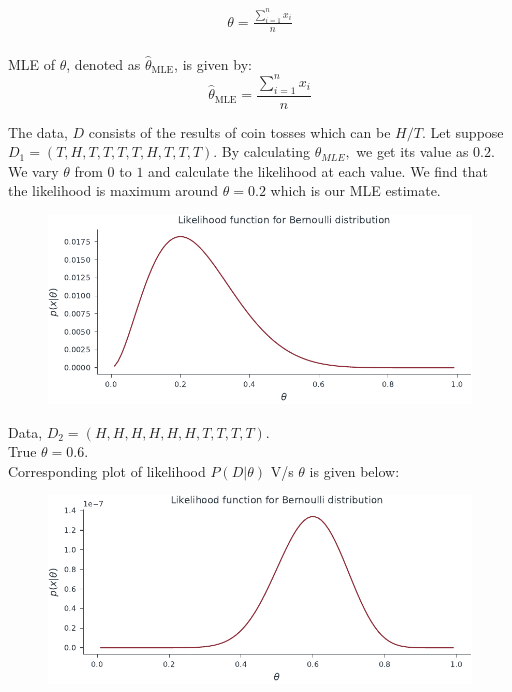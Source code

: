 \documentclass{beamer}
\begin{document}
\begin{frame}
        
    \begin{align*}
        \theta=\frac{\sum_{i=1}^n x_{i}}{n}\\
    \end{align*}
    \begin{tcolorbox}[colback=metropolisblue!5,colframe=metropolisblue,title=Maximum Likelihood Estimate for $\theta$]
        MLE of $\theta$, denoted as $\hat{\theta}_{\text{MLE}}$, is given by:
        \begin{equation*}
            \hat{\theta}_{\text{MLE}} = \frac{\sum_{i=1}^n x_{i}}{n}
        \end{equation*}
    \end{tcolorbox}
    
    \end{frame}

\begin{frame}
The data, $D$ consists of the results of coin tosses which can be $H/T.$ Let suppose $D_1 = (T,H,T,T,T,T,H,T,T,T).$ By calculating $\theta_{MLE},$ we get its value as $0.2.$ We vary $\theta$ from $0$ to $1$ and calculate the likelihood at each value. We find that the likelihood is maximum around $\theta=0.2$ which is our MLE estimate.
\begin{figure}
                \centerline{\includegraphics[scale = 0.75]{../figures/mle/bernoulli_likelihood.pdf}}
\end{figure}
    
\end{frame}
\begin{frame}
    Data, $D_2 = (H,H,H,H,H,H,T,T,T,T)$. \\True $\theta=0.6.$ \\Corresponding plot of likelihood $P(D|\theta)$ V/s $\theta$ is given below:
    \begin{figure}
                \centerline{\includegraphics[scale = 0.75]{../figures/mle/bernoulli_likelihood_1.pdf}}
\end{figure}
\end{frame}
\end{document}
